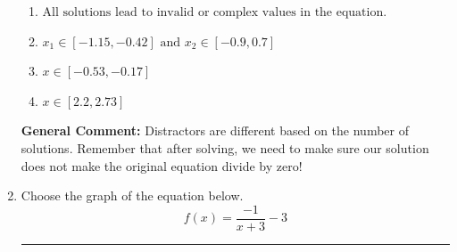 \documentclass{extbook}[14pt]
\newcommand{\litem}[1]{\item #1

\rule{\textwidth}{0.4pt}}
\begin{document}
\begin{enumerate}
{\begin{enumerate}[label=\Alph*.]
* $x = -0.581 \text{ and } x = 2.581$, which is the correct option.
\item \( \text{All solutions lead to invalid or complex values in the equation.} \)


\item \( x_1 \in [-1.15, -0.42] \text{ and } x_2 \in [-0.9,0.7] \)


\item \( x \in [-0.53,-0.17] \)


\item \( x \in [2.2,2.73] \)


\end{enumerate}

\textbf{General Comment:} Distractors are different based on the number of solutions. Remember that after solving, we need to make sure our solution does not make the original equation divide by zero!
}
\litem{
Choose the graph of the equation below.
\[ f(x) = \frac{-1}{x + 3} - 3 \]

}
\end{enumerate}
\end{document}
